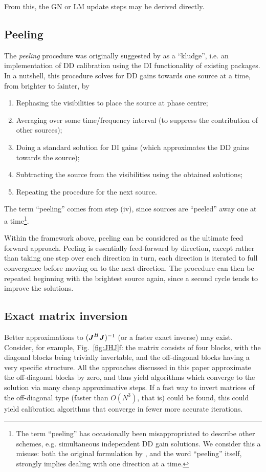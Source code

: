 \documentclass[useAMS,usenatbib]{mn2e}
\newcommand{\mat}[1]{{\bmath{#1}}}
\newcommand{\JJ}{\mat{J}} %
\newcommand{\JHJ}{\JJ^H\JJ} %
\begin{document}
From this, the GN or LM update steps may be derived directly.

\subsection{Peeling}
\label{sec:peeling}

The \emph{peeling} procedure was originally suggested by \citet{JEN:peeling} as a ``kludge'', i.e. an implementation of DD calibration 
using the DI functionality of existing packages. In a nutshell, this procedure solves for DD gains towards one source at a time, from
brighter to fainter, by

\begin{enumerate}
\item Rephasing the visibilities to place the source at phase centre;
\item Averaging over some time/frequency interval (to suppress the contribution of other sources);
\item Doing a standard solution for DI gains (which approximates the DD gains towards the source);
\item Subtracting the source from the visibilities using the obtained solutions;
\item Repeating the procedure for the next source.
\end{enumerate}

The term ``peeling'' comes from step (iv), since sources are ``peeled'' away one at a time\footnote{The term ``peeling'' has 
occasionally been misappropriated to describe other schemes, e.g. simultaneous independent DD gain solutions. We consider this a 
misuse: both the original formulation by \citet{JEN:peeling}, and the word ``peeling'' itself, strongly implies dealing with 
one direction at a time.}.

Within the framework above, peeling can be considered as the ultimate feed forward approach. Peeling is essentially feed-forward by direction, except rather than taking one step over each direction in turn, each direction is iterated to full convergence before moving on to the next direction. The procedure can then be repeated beginning with the brightest source again, since a second cycle tends to improve the solutions. 

\subsection{Exact matrix inversion}

Better approximations to $(\JHJ)^{-1}$ (or a faster exact inverse) may exist. Consider, for example, Fig.~\ref{fig:JHJ}f: 
the matrix consists of four blocks, with the diagonal blocks being trivially invertable, and the off-diagonal blocks having a 
very specific structure. All the approaches discussed in this paper approximate the off-diagonal blocks by zero, and thus 
yield algorithms which converge to the solution via many cheap approximative steps. If a fast way to invert matrices of the 
off-diagonal type (faster than $O(N^3)$, that is) could be found, this could yield calibration algorithms that converge in fewer 
more accurate iterations.
\end{document}

